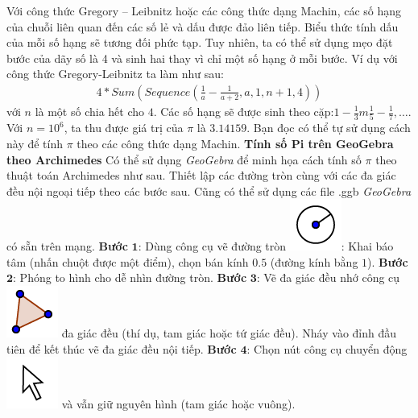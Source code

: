 \begin{multicols}{2}
	\vskip 0.1cm
	Với công thức Gregory -- Leibnitz hoặc các công thức dạng Machin, các số hạng của chuỗi liên quan đến các số lẻ và dấu được đảo liên tiếp. Biểu thức tính dấu của mỗi số hạng sẽ tương đối phức tạp. Tuy nhiên, ta có thể sử dụng mẹo đặt bước của dãy số là 4 và sinh hai thay vì chỉ một số hạng ở mỗi bước. Ví dụ với công thức Gregory-Leibnitz ta làm như sau:
	\begin{align*}
		4*Sum\!\!\left(\!\! {Sequence\left(\!\! {\frac{1}{a}\! -\! \frac{1}{{a \!+\! 2}},a,1,n \!+\! 1,4} \!\!\right)}\!\! \right)
	\end{align*}
	với $n$ là một số chia hết cho $4$. Các số hạng sẽ được sinh theo cặp:$1 - \frac{1}{3}m \frac{1}{5} - \frac{1}{7}, \ldots$.
	\vskip 0.1cm  
	Với  $n = 10^6$, ta thu được giá trị của $\pi$  là $3.14159$. Bạn đọc có thể tự sử dụng cách này để tính  $\pi$  theo các công thức dạng Machin.
	\vskip 0.1cm
	\textbf{\color{lichsutoanhoc}Tính số Pi trên GeoGebra theo Archimedes}
	\vskip 0.1cm 
	Có thể sử dụng \textit{GeoGebra} để minh họa cách tính số $\pi$  theo thuật toán Archimedes như sau. Thiết lập các đường tròn cùng với các đa giác đều nội ngoại tiếp theo các bước sau. Cũng có thể sử dụng các file .ggb \textit{GeoGebra} có sẵn trên mạng.  
	\vskip 0.1cm
	\textbf{\color{lichsutoanhoc}Bước} $\pmb1$: Dùng công cụ vẽ đường tròn \includegraphics[scale =0.25]{6}: Khai báo tâm (nhấn chuột được một điểm), chọn bán kính $0.5$ (đường kính bằng $1$).
	\vskip 0.1cm 
	\textbf{\color{lichsutoanhoc}Bước} $\pmb{2}$: Phóng to hình cho dễ nhìn đường tròn.
	\vskip 0.1cm
	\textbf{\color{lichsutoanhoc}Bước} $\pmb{3}$: Vẽ đa giác đều nhớ công cụ \includegraphics[scale =0.25]{7} đa giác đều (thí dụ, tam giác hoặc tứ giác đều). Nháy vào đỉnh đầu tiên để kết thúc vẽ đa giác đều nội tiếp.
	\vskip 0.1cm
	\textbf{\color{lichsutoanhoc}Bước} $\pmb{4}$: Chọn nút công cụ chuyển động \includegraphics[scale =0.25]{8} và vẫn giữ nguyên hình (tam giác hoặc vuông).

\end{multicols}
